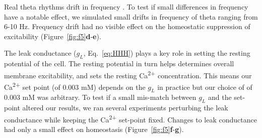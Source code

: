 \documentclass{article}
\begin{document}
Real theta rhythms drift in frequency \cite{Buzsaki2015}. To test if small differences in frequency have a notable effect, we simulated small drifts in frequency of theta ranging from 6-10 Hz. Frequency drift had no visible effect on the homeostatic suppression of excitability (Figure~\ref{fig:f5}\textbf{d}-\textbf{e}).

The leak conductance ($g_L$, Eq.~\ref{eq:HHH}) plays a key role in setting the resting potential of the cell. The resting potential in turn helps determines overall membrane excitability, and sets the resting Ca\textsuperscript{2+} concentration. This means our Ca\textsuperscript{2+} set point (of 0.003 mM) depends on the $g_L$ in practice but our choice of of 0.003 mM was arbitrary. To test if a small mis-match between $g_L$ and the set-point altered our results, we ran several experiments perturbing the leak conductance while keeping the Ca\textsuperscript{2+} set-point fixed. Changes to leak conductance had only a small effect on homeostasis (Figure~\ref{fig:f5}\textbf{f}-\textbf{g}).
\end{document}
